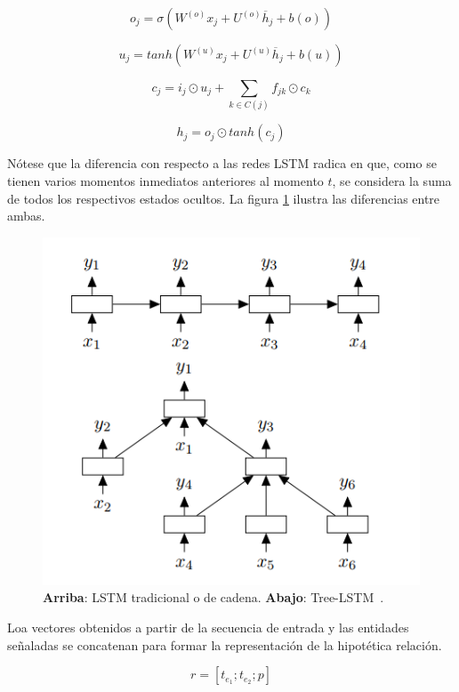 \begin{equation*}
o_j = \sigma(W^{(o)}x_j + U^{(o)}\overline{h}_j + b(o))
\end{equation*}

\begin{equation*}
u_j = tanh(W^{(u)}x_j + U^{(u)}\overline{h}_j + b(u))
\end{equation*}

\begin{equation*}
c_j = i_j \odot u_j + \sum_{k\in C(j)} f_{jk} \odot c_k
\end{equation*}

\begin{equation*}
h_j = o_j \odot tanh(c_j)
\end{equation*}

Nótese que la diferencia con respecto a las redes LSTM radica en que, como se tienen varios momentos inmediatos anteriores al momento $t$, se considera la suma de todos los respectivos estados ocultos. La figura \ref{fig:lstm_cmp} ilustra las diferencias entre ambas.

\begin{figure}[h!]
	\centering
	\includegraphics[width=0.7\linewidth]{Graphics/lstm_cmp.png}
	\caption{\textbf{Arriba}: LSTM tradicional o de cadena. \textbf{Abajo}: Tree-LSTM~\cite{tai2015improved}.}\label{fig:lstm_cmp}
\end{figure}

Loa vectores obtenidos a partir de la secuencia de entrada y las entidades señaladas se concatenan para formar la representación de la hipotética relación.

\begin{equation*}
	r = [t_{e_1}; t_{e_2}; p]
\end{equation*}

